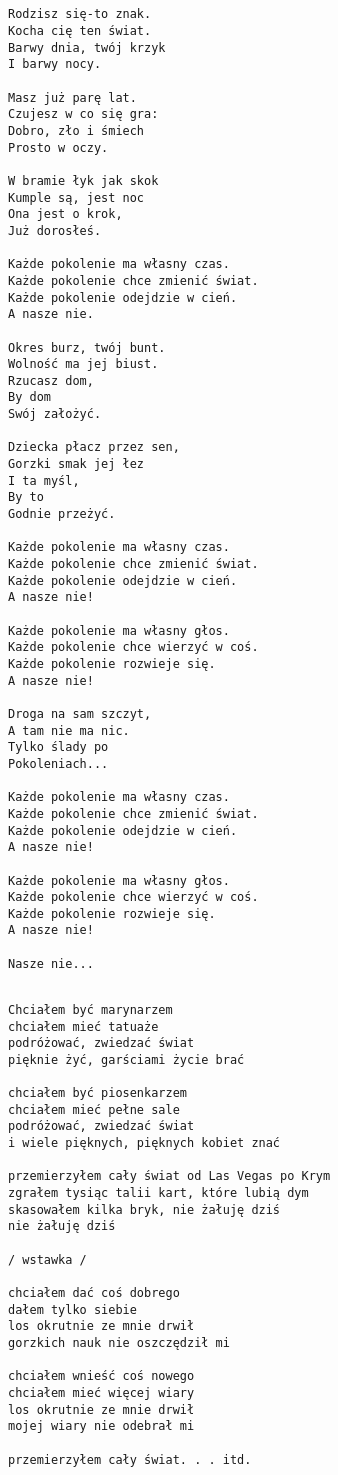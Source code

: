 \documentclass[12pt]{article}
\begin{document}
\subsection*{}
\begin{verbatim}
Rodzisz się-to znak.
Kocha cię ten świat.
Barwy dnia, twój krzyk
I barwy nocy.

Masz już parę lat.
Czujesz w co się gra:
Dobro, zło i śmiech
Prosto w oczy.

W bramie łyk jak skok
Kumple są, jest noc
Ona jest o krok,
Już dorosłeś.

Każde pokolenie ma własny czas.
Każde pokolenie chce zmienić świat.
Każde pokolenie odejdzie w cień.
A nasze nie.

Okres burz, twój bunt.
Wolność ma jej biust.
Rzucasz dom,
By dom
Swój założyć.

Dziecka płacz przez sen,
Gorzki smak jej łez
I ta myśl,
By to
Godnie przeżyć.

Każde pokolenie ma własny czas.
Każde pokolenie chce zmienić świat.
Każde pokolenie odejdzie w cień.
A nasze nie!

Każde pokolenie ma własny głos.
Każde pokolenie chce wierzyć w coś.
Każde pokolenie rozwieje się.
A nasze nie!

Droga na sam szczyt,
A tam nie ma nic.
Tylko ślady po
Pokoleniach...

Każde pokolenie ma własny czas.
Każde pokolenie chce zmienić świat.
Każde pokolenie odejdzie w cień.
A nasze nie!

Każde pokolenie ma własny głos.
Każde pokolenie chce wierzyć w coś.
Każde pokolenie rozwieje się.
A nasze nie!

Nasze nie...
\end{verbatim}
\clearpage

\subsection*{}
\begin{verbatim}
Chciałem być marynarzem
chciałem mieć tatuaże
podróżować, zwiedzać świat
pięknie żyć, garściami życie brać

chciałem być piosenkarzem
chciałem mieć pełne sale
podróżować, zwiedzać świat
i wiele pięknych, pięknych kobiet znać

przemierzyłem cały świat od Las Vegas po Krym
zgrałem tysiąc talii kart, które lubią dym
skasowałem kilka bryk, nie żałuję dziś
nie żałuję dziś

/ wstawka /

chciałem dać coś dobrego
dałem tylko siebie
los okrutnie ze mnie drwił
gorzkich nauk nie oszczędził mi

chciałem wnieść coś nowego
chciałem mieć więcej wiary
los okrutnie ze mnie drwił
mojej wiary nie odebrał mi

przemierzyłem cały świat. . . itd.
\end{verbatim}
\clearpage
\end{document}
